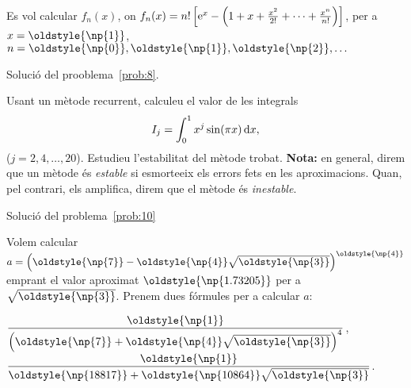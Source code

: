 \documentclass[a4paper,twoside,12pt]{exam}
\newcommand{\osnp}[1]{\oldstyle{\np{#1}}}
\begin{document}
\begin{questions}
\question\label{prob:8}
Es vol calcular $f_{n}(x)$, on $f_{n}(x) = n!\left[\mathrm{e}^{x} -
	\left(1 + x + \frac{x^{2}}{2!} + \dots + \frac{x^{n}}{n!}\right)
\right]$, per a $x = \osnp{1}$, $n=\osnp{0},\osnp{1},\osnp{2},\dots$
\begin{solution}
	Solució del prooblema~\ref{prob:8}.
\end{solution}

\question\label{prob:9}
Usant un mètode recurrent, calculeu el valor de les integrals
\begin{displaymath}
	I_{j} = \int_{0}^{1} x^{j}\sin(\pi x)\,\mathrm{d} x,
\end{displaymath}
($j=2,4,\dots,20$). Estudieu l'estabilitat del mètode trobat.
\textbf{Nota:} en general, direm que un mètode és \emph{estable} si esmorteeix
els errors fets en les aproximacions. Quan, pel contrari, els amplifica, direm
que el mètode és \emph{inestable}.
\begin{solution}
	Solució del problema~\ref{prob:10}
\end{solution}

\question\label{prob:10}
Volem calcular
$a = \left(\osnp{7} - \osnp{4}\sqrt{\osnp{3}}\right)^{\osnp{4}}$
emprant el valor aproximat $\osnp{1.73205}$ per a $\sqrt{\osnp{3}}$.
Prenem dues fórmules per a calcular $a$:

\begin{oneparchoices}
	\choice $\dfrac{\osnp{1}}{\left(\osnp{7} + 
	\osnp{4}\sqrt{\osnp{3}}\right)^{4}}$, 
	\choice $\dfrac{\osnp{1}}{\osnp{18817} +\osnp{10864}
	\sqrt{\osnp{3}}}$.
\end{oneparchoices}


\end{questions}
\end{document}

